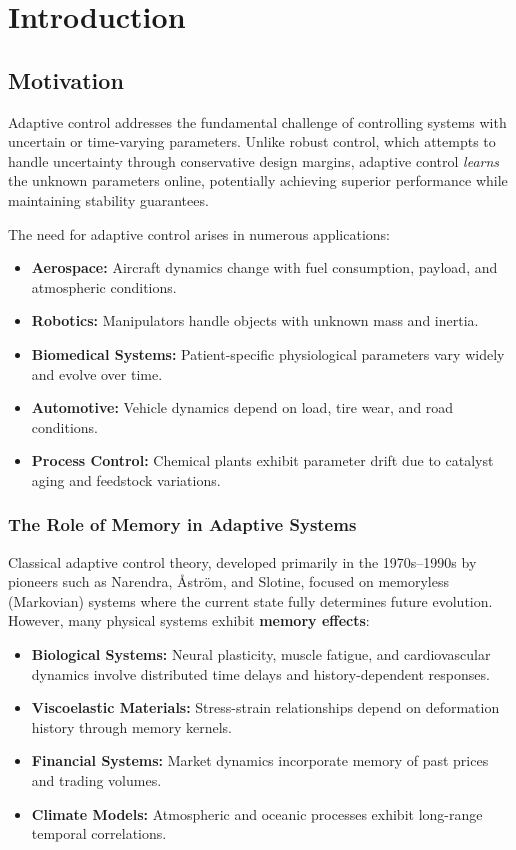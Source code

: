 \chapter{Introduction}
\label{ch:introduction}

\section{Motivation}

Adaptive control addresses the fundamental challenge of controlling systems with uncertain or time-varying parameters. Unlike robust control, which attempts to handle uncertainty through conservative design margins, adaptive control \textit{learns} the unknown parameters online, potentially achieving superior performance while maintaining stability guarantees.

The need for adaptive control arises in numerous applications:
\begin{itemize}
    \item \textbf{Aerospace:} Aircraft dynamics change with fuel consumption, payload, and atmospheric conditions.
    \item \textbf{Robotics:} Manipulators handle objects with unknown mass and inertia.
    \item \textbf{Biomedical Systems:} Patient-specific physiological parameters vary widely and evolve over time.
    \item \textbf{Automotive:} Vehicle dynamics depend on load, tire wear, and road conditions.
    \item \textbf{Process Control:} Chemical plants exhibit parameter drift due to catalyst aging and feedstock variations.
\end{itemize}

\subsection{The Role of Memory in Adaptive Systems}

Classical adaptive control theory, developed primarily in the 1970s--1990s by pioneers such as Narendra, Åström, and Slotine, focused on memoryless (Markovian) systems where the current state fully determines future evolution. However, many physical systems exhibit \textbf{memory effects}:
\begin{itemize}
    \item \textbf{Biological Systems:} Neural plasticity, muscle fatigue, and cardiovascular dynamics involve distributed time delays and history-dependent responses.
    \item \textbf{Viscoelastic Materials:} Stress-strain relationships depend on deformation history through memory kernels.
    \item \textbf{Financial Systems:} Market dynamics incorporate memory of past prices and trading volumes.
    \item \textbf{Climate Models:} Atmospheric and oceanic processes exhibit long-range temporal correlations.
\end{itemize}

